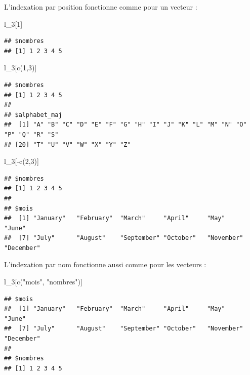 \documentclass[
  11pt,
]{book}
\newenvironment{Shaded}{\begin{snugshade}}{\end{snugshade}}
\newcommand{\DecValTok}[1]{\textcolor[rgb]{0.00,0.00,0.81}{#1}}
\newcommand{\FunctionTok}[1]{\textcolor[rgb]{0.00,0.00,0.00}{#1}}
\newcommand{\NormalTok}[1]{#1}
\newcommand{\SpecialCharTok}[1]{\textcolor[rgb]{0.00,0.00,0.00}{#1}}
\newcommand{\StringTok}[1]{\textcolor[rgb]{0.31,0.60,0.02}{#1}}
\numberwithin{equation}{section}
\numberwithin{countremarque}{section}
\begin{document}
L'indexation par position fonctionne comme pour un vecteur :

\begin{Shaded}
\begin{Highlighting}[]
\NormalTok{l\_3[}\DecValTok{1}\NormalTok{]}
\end{Highlighting}
\end{Shaded}

\begin{lstlisting}
## $nombres
## [1] 1 2 3 4 5
\end{lstlisting}

\begin{Shaded}
\begin{Highlighting}[]
\NormalTok{l\_3[}\FunctionTok{c}\NormalTok{(}\DecValTok{1}\NormalTok{,}\DecValTok{3}\NormalTok{)]}
\end{Highlighting}
\end{Shaded}

\begin{lstlisting}
## $nombres
## [1] 1 2 3 4 5
## 
## $alphabet_maj
##  [1] "A" "B" "C" "D" "E" "F" "G" "H" "I" "J" "K" "L" "M" "N" "O" "P" "Q" "R" "S"
## [20] "T" "U" "V" "W" "X" "Y" "Z"
\end{lstlisting}

\begin{Shaded}
\begin{Highlighting}[]
\NormalTok{l\_3[}\SpecialCharTok{{-}}\FunctionTok{c}\NormalTok{(}\DecValTok{2}\NormalTok{,}\DecValTok{3}\NormalTok{)]}
\end{Highlighting}
\end{Shaded}

\begin{lstlisting}
## $nombres
## [1] 1 2 3 4 5
## 
## $mois
##  [1] "January"   "February"  "March"     "April"     "May"       "June"     
##  [7] "July"      "August"    "September" "October"   "November"  "December"
\end{lstlisting}

L'indexation par nom fonctionne aussi comme pour les vecteurs :

\begin{Shaded}
\begin{Highlighting}[]
\NormalTok{l\_3[}\FunctionTok{c}\NormalTok{(}\StringTok{"mois"}\NormalTok{, }\StringTok{"nombres"}\NormalTok{)]}
\end{Highlighting}
\end{Shaded}

\begin{lstlisting}
## $mois
##  [1] "January"   "February"  "March"     "April"     "May"       "June"     
##  [7] "July"      "August"    "September" "October"   "November"  "December" 
## 
## $nombres
## [1] 1 2 3 4 5
\end{lstlisting}
\end{document}
